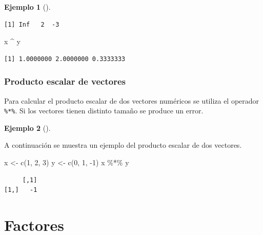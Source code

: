 \documentclass[
  a4paper,
]{scrreport}
\newenvironment{Shaded}{\begin{snugshade}}{\end{snugshade}}
\newcommand{\DecValTok}[1]{\textcolor[rgb]{0.68,0.00,0.00}{#1}}
\newcommand{\FunctionTok}[1]{\textcolor[rgb]{0.28,0.35,0.67}{#1}}
\newcommand{\NormalTok}[1]{\textcolor[rgb]{0.00,0.23,0.31}{#1}}
\newcommand{\OtherTok}[1]{\textcolor[rgb]{0.00,0.23,0.31}{#1}}
\newcommand{\SpecialCharTok}[1]{\textcolor[rgb]{0.37,0.37,0.37}{#1}}
\theoremstyle{definition}
\theoremstyle{definition}
\newtheorem{example}{Ejemplo}[chapter]
\theoremstyle{remark}
\begin{document}
\begin{example}[]
\begin{verbatim}
[1] Inf   2  -3
\end{verbatim}

\begin{Shaded}
\begin{Highlighting}[]
\NormalTok{x }\SpecialCharTok{\^{}}\NormalTok{ y}
\end{Highlighting}
\end{Shaded}

\begin{verbatim}
[1] 1.0000000 2.0000000 0.3333333
\end{verbatim}

\end{example}

\hypertarget{producto-escalar-de-vectores}{%
\subsubsection{Producto escalar de
vectores}\label{producto-escalar-de-vectores}}

Para calcular el producto escalar de dos vectores numéricos se utiliza
el operador \texttt{\%*\%}. Si los vectores tienen distinto tamaño se
produce un error.

\leavevmode{}%
\begin{example}[]\label{exm-producto-escalar}

A continuación se muestra un ejemplo del producto escalar de dos
vectores.

\begin{Shaded}
\begin{Highlighting}[]
\NormalTok{x }\OtherTok{\textless{}{-}} \FunctionTok{c}\NormalTok{(}\DecValTok{1}\NormalTok{, }\DecValTok{2}\NormalTok{, }\DecValTok{3}\NormalTok{)}
\NormalTok{y }\OtherTok{\textless{}{-}} \FunctionTok{c}\NormalTok{(}\DecValTok{0}\NormalTok{, }\DecValTok{1}\NormalTok{, }\SpecialCharTok{{-}}\DecValTok{1}\NormalTok{)}
\NormalTok{x }\SpecialCharTok{\%*\%}\NormalTok{ y}
\end{Highlighting}
\end{Shaded}

\begin{verbatim}
     [,1]
[1,]   -1
\end{verbatim}

\end{example}

\hypertarget{factores}{%
\section{Factores}\label{factores}}
\end{document}

